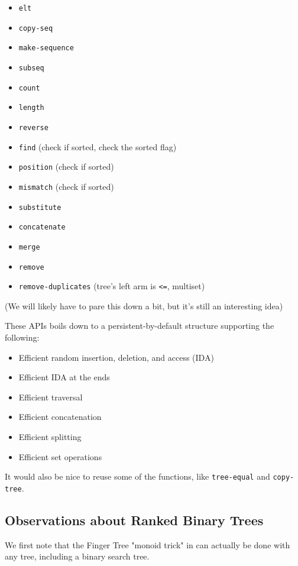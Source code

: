 \documentclass[sigconf]{acmart}
\begin{document}
\begin{itemize}
    \item \texttt{elt}
    \item \texttt{copy-seq}
    \item \texttt{make-sequence}
    \item \texttt{subseq}
    \item \texttt{count}
    \item \texttt{length}
    \item \texttt{reverse}
    \item \texttt{find} (check if sorted, check the sorted flag)
    \item \texttt{position} (check if sorted)
    \item \texttt{mismatch} (check if sorted)
    \item \texttt{substitute}
    \item \texttt{concatenate}
    \item \texttt{merge}
    \item \texttt{remove}
    \item \texttt{remove-duplicates} (tree's left arm is \texttt{<=}, multiset)
\end{itemize}

(We will likely have to pare this down a bit, but it's still an interesting
idea)

These APIs boils down to a persistent-by-default structure supporting the following:

\begin{itemize}
    \item Efficient random insertion, deletion, and access (IDA)
    \item Efficient IDA at the ends
    \item Efficient traversal
    \item Efficient concatenation
    \item Efficient splitting
    \item Efficient set operations
\end{itemize}

It would also be nice to reuse some of the functions, like \texttt{tree-equal} and
\texttt{copy-tree}.

\subsection{Observations about Ranked Binary Trees}

We first note that the Finger Tree "monoid trick" in
\cite{Hinze-Paterson:FingerTree} can actually be done with any tree, including a
binary search tree.
\end{document}
